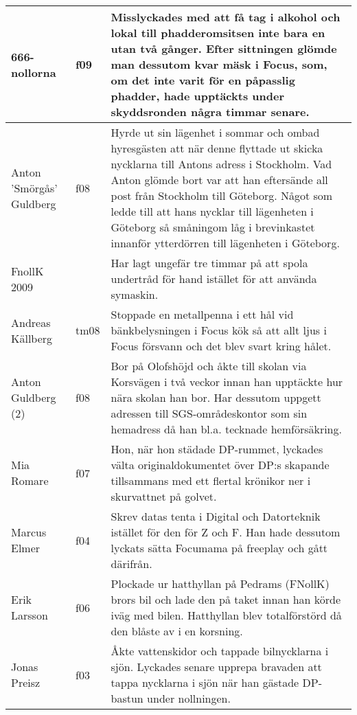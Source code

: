 \begin{longtable}{p{55mm}lp{60mm}}
666-nollorna & f09 & Misslyckades med att få tag i alkohol och lokal
till phadderomsitsen inte bara en utan två gånger. Efter sittningen
glömde man dessutom kvar mäsk i Focus, som, om det inte varit för en
påpasslig phadder, hade upptäckts under skyddsronden några timmar senare.\\ \hline

Anton 'Smörgås' Guldberg & f08 & Hyrde ut sin lägenhet i sommar och
ombad hyresgästen att när denne flyttade ut skicka nycklarna till Antons
adress i Stockholm. Vad Anton glömde bort var att han eftersände all
post från Stockholm till Göteborg. Något som ledde till att hans nycklar
till lägenheten i Göteborg så småningom låg i brevinkastet innanför
ytterdörren till lägenheten i Göteborg.\\ \hline

FnollK 2009 &  & Har lagt ungefär tre timmar på att spola undertråd för hand istället för att använda symaskin.\\ \hline

  Andreas Källberg & tm08 & Stoppade en metallpenna i ett hål vid bänkbelysningen i Focus kök så att allt ljus i Focus försvann och det blev svart kring hålet.\\ \hline

  Anton Guldberg (2) & f08 & Bor på Olofshöjd och åkte till skolan via Korsvägen i två veckor innan han upptäckte hur nära skolan han bor. Har dessutom uppgett adressen till SGS-områdeskontor som sin hemadress då han bl.a. tecknade hemförsäkring. \\ \hline

  Mia Romare & f07 & Hon, när hon städade DP-rummet, lyckades välta originaldokumentet över DP:s skapande tillsammans med ett flertal krönikor ner i skurvattnet på golvet.\\ \hline
  
  Marcus Elmer & f04 & Skrev datas tenta i Digital och Datorteknik istället för den för Z och F. Han hade dessutom lyckats sätta Focumama på freeplay och gått därifrån.\\ \hline
  
  Erik Larsson & f06 & Plockade ur hatthyllan på Pedrams (FNollK) brors bil och lade den på taket innan han körde iväg med bilen. Hatthyllan blev totalförstörd då den blåste av i en korsning.\\ \hline
  
  Jonas Preisz & f03 & Åkte vattenskidor och tappade bilnycklarna i sjön. Lyckades senare upprepa bravaden att tappa nycklarna i sjön när han gästade DP-bastun under nollningen.\\ \hline
  

\end{longtable}
